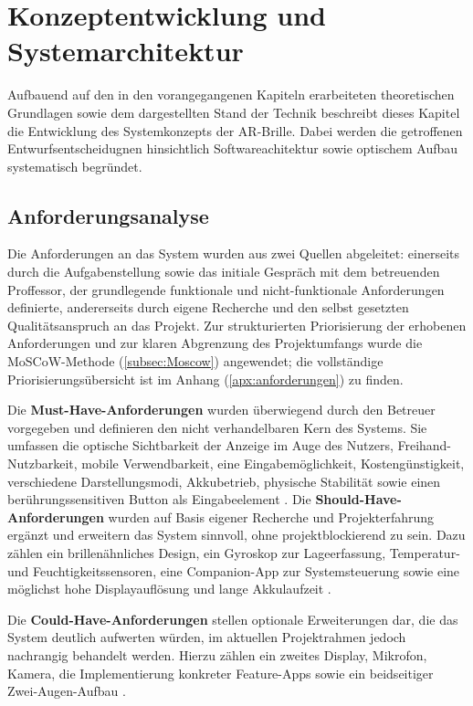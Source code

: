 
\chapter{Konzeptentwicklung und Systemarchitektur}
\label{chap:konzeptundsystem}
Aufbauend auf den in den vorangegangenen Kapiteln erarbeiteten theoretischen Grundlagen sowie dem dargestellten Stand der Technik beschreibt dieses Kapitel die Entwicklung des Systemkonzepts der \ac{AR}-Brille. Dabei werden die getroffenen Entwurfsentscheidugnen hinsichtlich Softwareachitektur sowie optischem Aufbau systematisch begründet.

\section{Anforderungsanalyse}
\label{sec:Anforderungsanalyse}
Die Anforderungen an das System wurden aus zwei Quellen abgeleitet: einerseits durch die Aufgabenstellung sowie das initiale Gespräch mit dem betreuenden Proffessor, der grundlegende funktionale und nicht-funktionale Anforderungen definierte, andererseits durch eigene Recherche und den selbst gesetzten Qualitätsanspruch an das Projekt. Zur strukturierten Priorisierung der erhobenen Anforderungen und zur klaren Abgrenzung des Projektumfangs wurde die MoSCoW-Methode (\ref{subsec:Moscow}) angewendet; die vollständige Priorisierungsübersicht ist im Anhang (\ref{apx:anforderungen}) zu finden.

Die \textbf{Must-Have-Anforderungen} wurden überwiegend durch den Betreuer vorgegeben und definieren den nicht verhandelbaren Kern des Systems. Sie umfassen die optische Sichtbarkeit der Anzeige im Auge des Nutzers, Freihand-Nutzbarkeit, mobile Verwendbarkeit, eine Eingabemöglichkeit, Kostengünstigkeit, verschiedene Darstellungsmodi, Akkubetrieb, physische Stabilität sowie einen berührungssensitiven Button als Eingabeelement .
\newpage
Die \textbf{Should-Have-Anforderungen} wurden auf Basis eigener Recherche und Projekterfahrung ergänzt und erweitern das System sinnvoll, ohne projektblockierend zu sein. Dazu zählen ein brillenähnliches Design, ein Gyroskop zur Lageerfassung, Temperatur- und Feuchtigkeitssensoren, eine Companion-App zur Systemsteuerung sowie eine möglichst hohe Displayauflösung und lange Akkulaufzeit .

Die \textbf{Could-Have-Anforderungen} stellen optionale Erweiterungen dar, die das System deutlich aufwerten würden, im aktuellen Projektrahmen jedoch nachrangig behandelt werden. Hierzu zählen ein zweites Display, Mikrofon, Kamera, die Implementierung konkreter Feature-Apps sowie ein beidseitiger Zwei-Augen-Aufbau .

